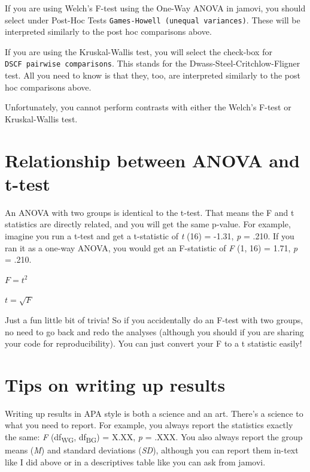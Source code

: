 \documentclass[
]{book}
\begin{document}
If you are using Welch's F-test using the One-Way ANOVA in jamovi, you should select under Post-Hoc Tests \texttt{Games-Howell\ (unequal\ variances)}. These will be interpreted similarly to the post hoc comparisons above.

If you are using the Kruskal-Wallis test, you will select the check-box for \texttt{DSCF\ pairwise\ comparisons}. This stands for the Dwass-Steel-Critchlow-Fligner test. All you need to know is that they, too, are interpreted similarly to the post hoc comparisons above.

Unfortunately, you cannot perform contrasts with either the Welch's F-test or Kruskal-Wallis test.

\hypertarget{relationship-between-anova-and-t-test}{%
\section{Relationship between ANOVA and t-test}\label{relationship-between-anova-and-t-test}}

An ANOVA with two groups is identical to the t-test. That means the F and t statistics are directly related, and you will get the same p-value. For example, imagine you run a t-test and get a t-statistic of \emph{t} (16) = -1.31, \emph{p} = .210. If you ran it as a one-way ANOVA, you would get an F-statistic of \emph{F} (1, 16) = 1.71, \emph{p} = .210.

\(F = t^2\)

\(t = \sqrt{F}\)

Just a fun little bit of trivia! So if you accidentally do an F-test with two groups, no need to go back and redo the analyses (although you should if you are sharing your code for reproducibility). You can just convert your F to a t statistic easily!

\hypertarget{tips-on-writing-up-results}{%
\section{Tips on writing up results}\label{tips-on-writing-up-results}}

Writing up results in APA style is both a science and an art. There's a science to what you need to report. For example, you always report the statistics exactly the same: \emph{F} (df\textsubscript{WG}, df\textsubscript{BG}) = X.XX, \emph{p} = .XXX. You also always report the group means (\emph{M}) and standard deviations (\emph{SD}), although you can report them in-text like I did above or in a descriptives table like you can ask from jamovi.
\end{document}
